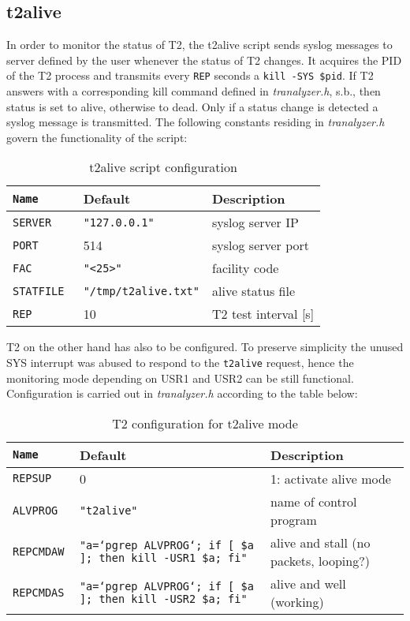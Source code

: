 \documentclass[documentation]{subfiles}
\begin{document}
\subsection{t2alive}\label{t2alive}
In order to monitor the status of T2, the t2alive script sends syslog messages to server defined by the user whenever the status of T2 changes.
It acquires the PID of the T2 process and transmits every {\tt REP} seconds a {\tt kill -SYS \$pid}.
If T2 answers with a corresponding kill command defined in {\em tranalyzer.h}, s.b., then status is set to alive, otherwise to dead.
Only if a status change is detected a syslog message is transmitted.
The following constants residing in {\em tranalyzer.h} govern the functionality of the script:

\begin{table}[!ht]
\centering
\begin{tabular}{>{\tt}lll}
    \toprule
    {\bf Name} & {\bf Default}                  & {\bf Description}\\
    \midrule
    SERVER     & {\tt\small "127.0.0.1"}        & syslog server IP\\
    PORT       & 514                            & syslog server port\\
    FAC        & {\tt\small "<25>"}             & facility code\\
    STATFILE   & {\tt\small "/tmp/t2alive.txt"} & alive status file\\
    REP        & 10                             & T2 test interval [s]\\
    \bottomrule
\end{tabular}
\caption{t2alive script configuration}
\end{table}

T2 on the other hand has also to be configured.
To preserve simplicity the unused SYS interrupt was abused to respond to the {\tt t2alive} request, hence the monitoring mode depending on USR1 and USR2 can be still functional.
Configuration is carried out in {\em tranalyzer.h} according to the table below:

\begin{table}[!ht]
\centering
\small
\begin{tabular}{>{\tt}lll}
    \toprule
    {\bf Name} & {\bf Default} & {\bf Description}\\
    \midrule
    REPSUP   & 0                     & 1: activate alive mode\\
    ALVPROG  & {\tt\small "t2alive"} & name of control program\\

    REPCMDAW & {\tt\small "a=`pgrep ALVPROG`; if [ \$a ]; then kill -USR1 \$a; fi"}
                                     & alive and stall (no packets, looping?)\\
    REPCMDAS & {\tt\small "a=`pgrep ALVPROG`; if [ \$a ]; then kill -USR2 \$a; fi"}
                                     & alive and well (working)\\
    \bottomrule
\end{tabular}
\caption{T2 configuration for t2alive mode}
\end{table}
\end{document}
